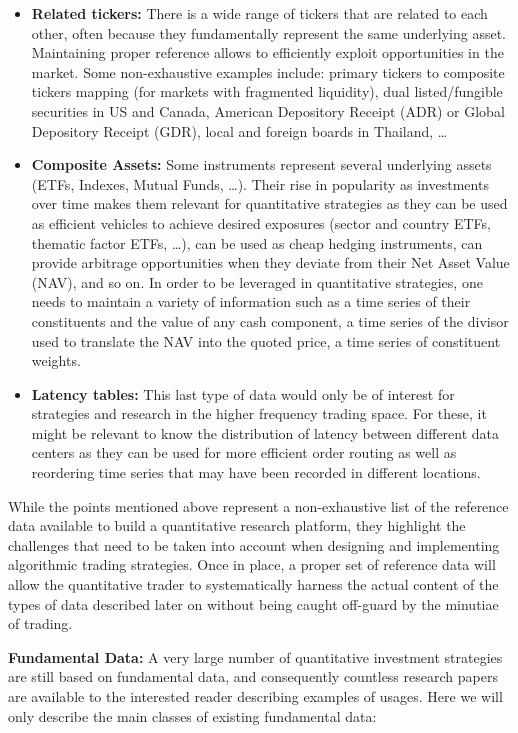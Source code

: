 \begin{itemize}
\item \textbf{Related tickers:} There is a wide range of tickers that are related to each other, often because they fundamentally represent the same underlying asset. Maintaining proper reference allows to efficiently exploit opportunities in the market. Some non-exhaustive examples include: primary tickers to composite tickers mapping (for markets with fragmented liquidity), dual listed/fungible securities in US and Canada, American Depository Receipt (ADR) or Global Depository Receipt (GDR), local and foreign boards in Thailand, \dots 


\item \textbf{Composite Assets:} Some instruments represent several underlying assets (ETFs, Indexes, Mutual Funds, \dots). Their rise in popularity as investments over time makes them relevant for quantitative strategies as they can be used as efficient vehicles to achieve desired exposures (sector and country ETFs, thematic factor ETFs, \dots), can be used as cheap hedging instruments, can provide arbitrage opportunities when they deviate from their Net Asset Value (NAV), and so on. 
In order to be leveraged in quantitative strategies, one needs to maintain a variety of information such as a time series of their constituents and the value of any cash component, a time series of the divisor used to translate the NAV into the quoted price, a time series of constituent weights. 


\item \textbf{Latency tables:} This last type of data would only be of interest for strategies and research in the higher frequency trading space. For these, it might be relevant to know the distribution of latency between different data centers as they can be used for more efficient order routing as well as reordering time series that may have been recorded in different locations.
\end{itemize}


While the points mentioned above represent a non-exhaustive list of the reference data available to build a quantitative research platform, they highlight the challenges that need to be taken into account when designing and implementing algorithmic trading strategies. Once in place, a proper set of reference data will allow the quantitative trader to systematically harness the actual content of the types of data described later on without being caught off-guard by the minutiae of trading.


\noindent\textbf{Fundamental Data:} A very large number of quantitative investment strategies are still based on fundamental data, and consequently countless research papers are available to the interested reader describing examples of usages. Here we will only describe the main classes of existing fundamental data:

